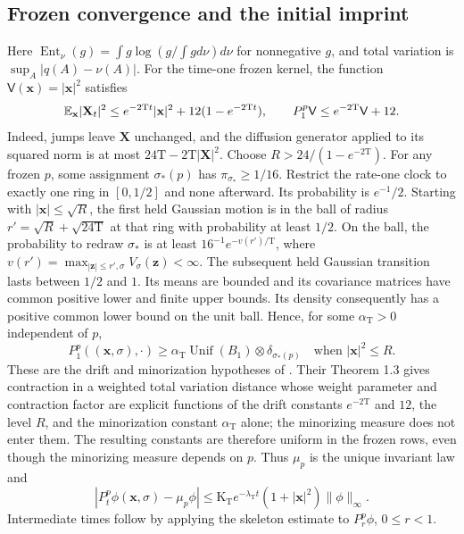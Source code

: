\subsection*{Frozen convergence and the initial imprint}

Here \(\operatorname{Ent}_\nu(g)=\int g\log(g/\int g d\nu)d\nu\)
for nonnegative \(g\), and total variation is \(\sup_A|q(A)-\nu(A)|\).
For the time-one frozen kernel, the function
\(\mathsf V(\mathbf x)=|\mathbf x|^2\) satisfies
\begin{equation}
 \mathbb E_{\mathbf x}|\mathbf X_t|^2
 \le e^{-2\mathrm Tt}|\mathbf x|^2+12(1-e^{-2\mathrm Tt}),\qquad
 P_1^p\mathsf V\le e^{-2\mathrm T}\mathsf V+12.
\label{eq:phil-selection-moment}
\end{equation}
Indeed, jumps leave \(\mathbf X\) unchanged, and the diffusion generator
applied to its squared norm is at most \(24\mathrm T-2\mathrm T|\mathbf X|^2\).
Choose \(R>24/(1-e^{-2\mathrm T})\). For any frozen \(p\), some assignment
\(\sigma_*(p)\) has \(\pi_{\sigma_*}\ge1/16\). Restrict the rate-one
clock to exactly one ring in \([0,1/2]\) and none afterward. Its probability
is \(e^{-1}/2\). Starting with \(|\mathbf x|\le\sqrt R\), the first held
Gaussian motion is in the ball of radius
\(r'=\sqrt R+\sqrt{24\mathrm T}\) at that ring with probability at least
\(1/2\). On the ball, the probability to redraw \(\sigma_*\) is at least
\(16^{-1}e^{-v(r')/\mathrm T}\), where
\(v(r')=\max_{|\mathbf z|\le r',\sigma}V_\sigma(\mathbf z)<\infty\).
The subsequent held Gaussian transition lasts between \(1/2\) and \(1\).
Its means are bounded and its covariance matrices have common positive
lower and finite upper bounds. Its density consequently has a positive
common lower bound on the unit ball. Hence, for some \(\alpha_{\mathrm T}>0\)
independent of \(p\),
\[
 P_1^p((\mathbf x,\sigma),\cdot)
 \ge\alpha_{\mathrm T}\operatorname{Unif}(B_1)
                         \otimes\delta_{\sigma_*(p)}
 \quad\text{when }|\mathbf x|^2\le R.
\]
These are the drift and minorization hypotheses of
\citet[Assumptions 1--2 and Theorems 1.2--1.3]{HairerMattingly2011}.
Their Theorem 1.3 gives contraction in a weighted total variation distance
whose weight parameter and contraction factor are explicit functions of
the drift constants \(e^{-2\mathrm T}\) and \(12\), the level \(R\), and the
minorization constant \(\alpha_{\mathrm T}\) alone; the minorizing measure
does not enter them. The resulting constants are therefore uniform in the
frozen rows, even though the minorizing measure depends on \(p\).
Thus \(\mu_p\) is the unique invariant law and
\begin{equation}
 |P_t^p\phi(\mathbf x,\sigma)-\mu_p\phi|
 \le\mathrm K_{\mathrm T}e^{-\lambda_{\mathrm T}t}
       (1+|\mathbf x|^2)\|\phi\|_\infty.
\label{eq:phil-selection-harris}
\end{equation}
Intermediate times follow by applying the skeleton estimate to
\(P_r^p\phi\), \(0\le r<1\).

